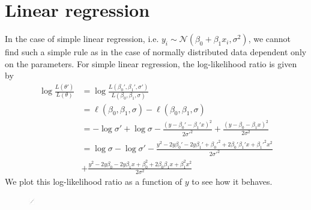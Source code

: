 {\section{Linear regression}
In the case of simple linear regression, i.e. $y_i \sim \mathcal{N}\left(\beta_0 + \beta_1 x_i, \sigma^2\right)$, we cannot find such a simple rule as in the case of normally distributed data dependent only on the parameters. 
For simple linear regression, the log-likelihood ratio is given by 
\begin{equation}
\begin{split}
    \log \frac{L\left(\theta'\right)}{L\left(\theta\right)} &= \log \frac{L\left(\beta_0', \beta_1', \sigma'\right)}{L\left(\beta_0, \beta_1, \sigma\right)}  \\
    & = \ell\left(\beta_0, \beta_1, \sigma\right) - \ell\left(\beta_0, \beta_1, \sigma\right) \\
    & = -\log\sigma' + \log\sigma - \frac{\left(y - \beta_0' - \beta_1'x\right)^2}{2\sigma'^2} + \frac{\left(y - \beta_0 - \beta_1x\right)^2}{2\sigma^2} \\
    & = \log \sigma - \log \sigma' - \frac{y^2 - 2y\beta_0'  - 2y\beta_1' + \beta_0'^2 + 2\beta_0'\beta_1'x + \beta_1'^2x^2 }{2\sigma'^2} \\ &+ \frac{y^2 - 2y\beta_0 - 2y\beta_1x + \beta_0^2 + 2\beta_0\beta_1x + \beta_1^2x^2}{2\sigma^2}
    \end{split}
\end{equation}
We plot this log-likelihood ratio as a function of $y$ to see how it behaves. 
\begin{figure}[H]
    \centering
    \includegraphics[scale = 0.7, height = 13]{figures/loglik_ratio2.pdf}

\end{figure}}
